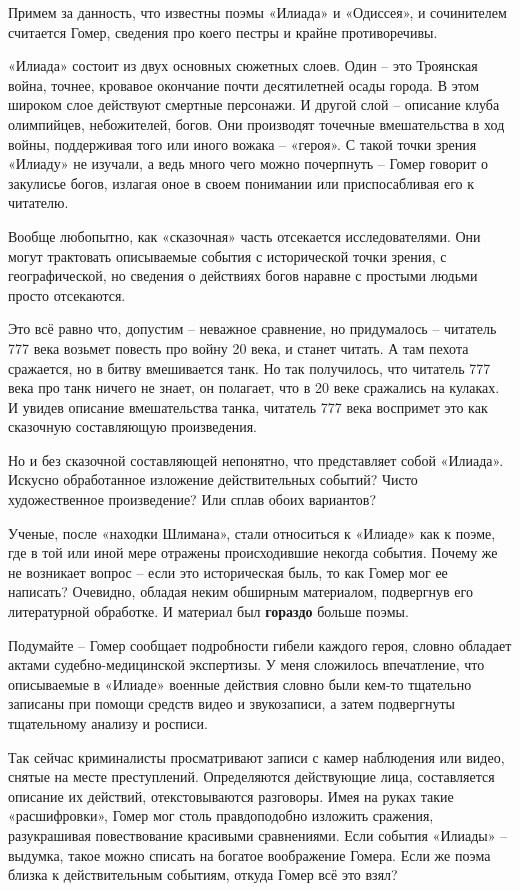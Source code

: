 Примем за данность, что известны поэмы «Илиада» и «Одиссея», и сочинителем считается Гомер, сведения про коего пестры и крайне противоречивы.

«Илиада» состоит из двух основных сюжетных слоев. Один – это Троянская война, точнее, кровавое окончание почти десятилетней осады города. В этом широком слое действуют смертные персонажи. И другой слой – описание клуба олимпийцев, небожителей, богов. Они производят точечные вмешательства в ход войны, поддерживая того или иного вожака – «героя». С такой точки зрения «Илиаду» не изучали, а ведь много чего можно почерпнуть – Гомер говорит о закулисье богов, излагая оное в своем понимании или приспосабливая его к читателю.

Вообще любопытно, как «сказочная» часть отсекается исследователями. Они могут трактовать описываемые события с исторической точки зрения, с географической, но сведения о действиях богов наравне с простыми людьми просто отсекаются.

Это всё равно что, допустим – неважное сравнение, но придумалось – читатель 777 века возьмет повесть про войну 20 века, и станет читать. А там пехота сражается, но в битву вмешивается танк. Но так получилось, что читатель 777 века про танк ничего не знает, он полагает, что в 20 веке сражались на кулаках. И увидев описание вмешательства танка, читатель 777 века воспримет это как сказочную составляющую произведения.

Но и без сказочной составляющей непонятно, что представляет собой «Илиада». Искусно обработанное изложение действительных событий? Чисто художественное произведение? Или сплав обоих вариантов?

Ученые, после «находки Шлимана», стали относиться к «Илиаде» как к поэме, где в той или иной мере отражены происходившие некогда события. Почему же не возникает вопрос – если это историческая быль, то как Гомер мог ее написать? Очевидно, обладая неким обширным материалом, подвергнув его литературной обработке. И материал был \textbf{гораздо} больше поэмы.

Подумайте – Гомер сообщает подробности гибели каждого героя, словно обладает актами судебно-медицин\-ской экспертизы. У меня сложилось впечатление, что описываемые в «Илиаде» военные действия словно были кем-то тщательно записаны при помощи средств видео и звукозаписи, а затем подвергнуты тщательному анализу и росписи. 

Так сейчас криминалисты просматривают записи с камер наблюдения или видео, снятые на месте преступлений. Определяются действующие лица, составляется описание их действий, отекстовываются разговоры. Имея на руках такие «расшифровки», Гомер мог столь правдоподобно изложить сражения, разукрашивая повествование красивыми сравнениями. Если события «Илиады» – выдумка, такое можно списать на богатое воображение Гомера. Если же поэма близка к действительным событиям, откуда Гомер всё это взял?

